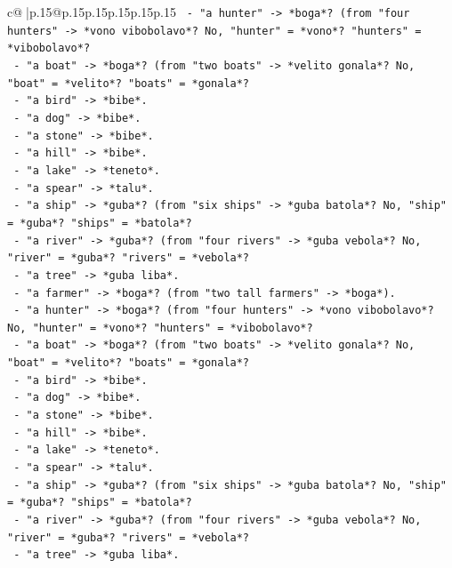 \documentclass{article}
\begin{document}
{\begin{supertabular}{c@{$\;$}|p{.15\linewidth}@{}p{.15\linewidth}p{.15\linewidth}p{.15\linewidth}p{.15\linewidth}p{.15\linewidth}}
{{{\texttt{      {-} "a hunter" {-}> *boga*? (from "four hunters" {-}> *vono vibobolavo*? No, "hunter" = *vono*? "hunters" = *vibobolavo*?} \\
\texttt{      {-} "a boat" {-}> *boga*? (from "two boats" {-}> *velito gonala*? No, "boat" = *velito*? "boats" = *gonala*?} \\
\texttt{      {-} "a bird" {-}> *bibe*.} \\
\texttt{      {-} "a dog" {-}> *bibe*.} \\
\texttt{      {-} "a stone" {-}> *bibe*.} \\
\texttt{      {-} "a hill" {-}> *bibe*.} \\
\texttt{      {-} "a lake" {-}> *teneto*.} \\
\texttt{      {-} "a spear" {-}> *talu*.} \\
\texttt{      {-} "a ship" {-}> *guba*? (from "six ships" {-}> *guba batola*? No, "ship" = *guba*? "ships" = *batola*?} \\
\texttt{      {-} "a river" {-}> *guba*? (from "four rivers" {-}> *guba vebola*? No, "river" = *guba*? "rivers" = *vebola*?} \\
\texttt{      {-} "a tree" {-}> *guba liba*.} \\
\texttt{      {-} "a farmer" {-}> *boga*? (from "two tall farmers" {-}> *boga*).} \\
\texttt{      {-} "a hunter" {-}> *boga*? (from "four hunters" {-}> *vono vibobolavo*? No, "hunter" = *vono*? "hunters" = *vibobolavo*?} \\
\texttt{      {-} "a boat" {-}> *boga*? (from "two boats" {-}> *velito gonala*? No, "boat" = *velito*? "boats" = *gonala*?} \\
\texttt{      {-} "a bird" {-}> *bibe*.} \\
\texttt{      {-} "a dog" {-}> *bibe*.} \\
\texttt{      {-} "a stone" {-}> *bibe*.} \\
\texttt{      {-} "a hill" {-}> *bibe*.} \\
\texttt{      {-} "a lake" {-}> *teneto*.} \\
\texttt{      {-} "a spear" {-}> *talu*.} \\
\texttt{      {-} "a ship" {-}> *guba*? (from "six ships" {-}> *guba batola*? No, "ship" = *guba*? "ships" = *batola*?} \\
\texttt{      {-} "a river" {-}> *guba*? (from "four rivers" {-}> *guba vebola*? No, "river" = *guba*? "rivers" = *vebola*?} \\
\texttt{      {-} "a tree" {-}> *guba liba*.} \\
}}}
\end{supertabular}}
\end{document}
